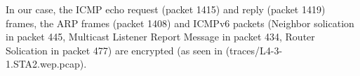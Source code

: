 In our case, the ICMP echo request (packet 1415) and reply (packet 1419) frames, the ARP frames (packet 1408) and ICMPv6 packets (Neighbor solication in packet 445, Multicast Listener Report Message in packet 434, Router Solication in packet 477) are encrypted (as seen in (traces/L4-3-1.STA2.wep.pcap).
